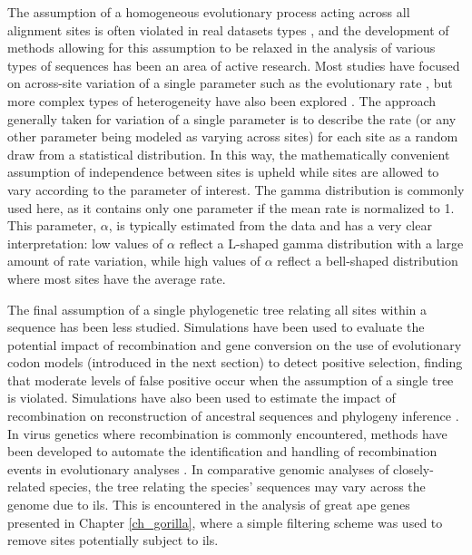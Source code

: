 The assumption of a homogeneous evolutionary process acting across all
alignment sites is often violated in real datasets types
\citep{Yang2006,Whelan2008}, and the development of methods allowing
for this assumption to be relaxed in the analysis of various types of
sequences has been an area of active research. Most studies have
focused on across-site variation of a single parameter such as the
evolutionary rate \citep{Uzzell1971,Yang1994c,Yang1996,Nielsen1998a},
but more complex types of heterogeneity have also been explored
\citep{Lartillot2004} . The approach generally taken for variation of
a single parameter is to describe the rate (or any other parameter
being modeled as varying across sites) for each site as a random draw
from a statistical distribution. In this way, the mathematically
convenient assumption of independence between sites is upheld while
sites are allowed to vary according to the parameter of interest. The
gamma distribution is commonly used here, as it contains only one
parameter if the mean rate is normalized to 1. This parameter,
$\alpha$, is typically estimated from the data and has a very clear
interpretation: low values of $\alpha$ reflect a L-shaped gamma
distribution with a large amount of rate variation, while high values
of $\alpha$ reflect a bell-shaped distribution where most sites have
the average rate.

The final assumption of a single phylogenetic tree relating all sites
within a sequence has been less studied. Simulations have been used to
evaluate the potential impact of recombination
\citet{Anisimova2003,Shriner2003} and gene conversion
\citet{Casola2009} on the use of evolutionary codon models (introduced
in the next section) to detect positive selection, finding that
moderate levels of false positive occur when the assumption of a
single tree is violated. Simulations have also been used to estimate
the impact of recombination on reconstruction of ancestral sequences
\citep{Busto2010} and phylogeny inference \citep{Schierup2000}. In
virus genetics where recombination is commonly encountered, methods
have been developed to automate the identification and handling of
recombination events in evolutionary analyses \citep{Pond2006}. In
comparative genomic analyses of closely-related species, the tree
relating the species' sequences may vary across the genome due to
\ac{ils}. This is encountered in the analysis of great ape genes
presented in Chapter \ref{ch_gorilla}, where a simple filtering scheme
was used to remove sites potentially subject to \ac{ils}.

